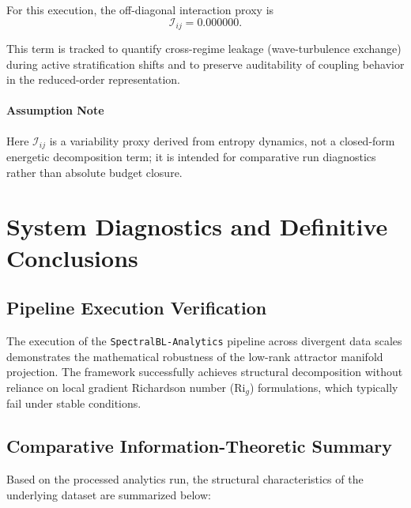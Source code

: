 \documentclass[11pt,a4paper]{article}
\begin{document}
For this execution, the off-diagonal interaction proxy is
\[
\mathcal{I}_{ij} = 0.000000.
\]

This term is tracked to quantify cross-regime leakage (wave-turbulence exchange) during active stratification shifts and to preserve auditability of coupling behavior in the reduced-order representation.

\paragraph{Assumption Note}
Here $\mathcal{I}_{ij}$ is a variability proxy derived from entropy dynamics, not a closed-form energetic decomposition term; it is intended for comparative run diagnostics rather than absolute budget closure.

\label{sec:regime_gabls3}
 
\newpage



\section{System Diagnostics and Definitive Conclusions}

\subsection{Pipeline Execution Verification}

The execution of the \texttt{SpectralBL-Analytics} pipeline across divergent data scales demonstrates the mathematical robustness of the low-rank attractor manifold projection. The framework successfully achieves structural decomposition without reliance on local gradient Richardson number ($\text{Ri}_g$) formulations, which typically fail under stable conditions.

\subsection{Comparative Information-Theoretic Summary}

Based on the processed analytics run, the structural characteristics of the underlying dataset are summarized below:
\end{document}
